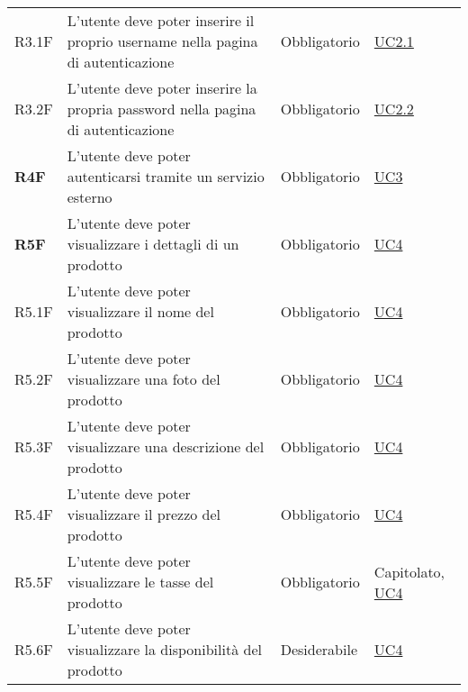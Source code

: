 \begin{center}
\begin{longtable}[!h]{p{50px} p{245px} p{75px} p{50px}}
        R3.1F                                 & L'utente deve poter inserire il proprio username nella pagina di autenticazione                     & Obbligatorio             & \hyperref[sec:UC2.1]{UC2.1}                    \\
        R3.2F                                 & L'utente deve poter inserire la propria password nella pagina di autenticazione                     & Obbligatorio             & \hyperref[sec:UC2.2]{UC2.2}                    \\
        \textbf{R4F}                          & L'utente deve poter autenticarsi tramite un servizio esterno                                        & Obbligatorio             & \hyperref[sec:UC3]{UC3}                        \\
        \textbf{R5F}                          & L'utente deve poter visualizzare i dettagli di un prodotto                                          & Obbligatorio             & \hyperref[sec:UC4]{UC4}                        \\
        R5.1F                                 & L'utente deve poter visualizzare il nome del prodotto                                               & Obbligatorio             & \hyperref[sec:UC4]{UC4}                        \\
        R5.2F                                 & L'utente deve poter visualizzare una foto del prodotto                                              & Obbligatorio             & \hyperref[sec:UC4]{UC4}                        \\
        R5.3F                                 & L'utente deve poter visualizzare una descrizione del prodotto                                       & Obbligatorio             & \hyperref[sec:UC4]{UC4}                        \\
        R5.4F                                 & L'utente deve poter visualizzare il prezzo del prodotto                                             & Obbligatorio             & \hyperref[sec:UC4]{UC4}                        \\
        R5.5F                                 & L'utente deve poter visualizzare le tasse del prodotto                                              & Obbligatorio             & Capitolato, \newline \hyperref[sec:UC4]{UC4}   \\
        R5.6F                                 & L'utente deve poter visualizzare la disponibilità del prodotto                                      & Desiderabile             & \hyperref[sec:UC4]{UC4}                        \\

\end{longtable}
\end{center}

